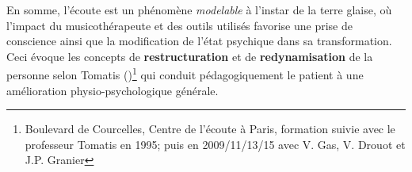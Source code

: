 















En somme, l'écoute est un phénomène \textit{modelable} à l'instar de
la terre glaise, où l'impact du musicothérapeute et des outils utilisés favorise une prise de
conscience ainsi que la modification
de  l'état psychique dans sa transformation.
Ceci évoque les concepts de \textbf{restructuration }et de
\textbf{redynamisation} de la personne selon Tomatis (\cite{tomatis.com})\footnote{Boulevard de Courcelles, Centre de l'écoute à Paris, formation
   suivie avec le professeur Tomatis en 1995; puis en 2009/11/13/15 avec V. Gas, V. Drouot et
J.P. Granier}
qui conduit pédagogiquement le patient à une amélioration physio-psychologique
générale.



